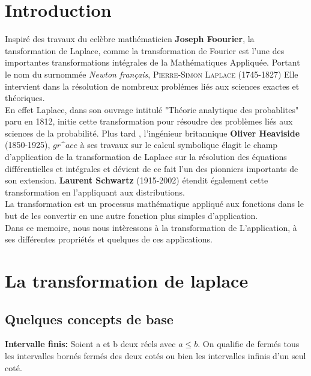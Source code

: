 \documentclass[12pt,a4paper]{report}
\begin{document}
\pagecolor{white!10}
\tableofcontents

\newpage

\chapter{Introduction}

   Inspiré des travaux du celèbre mathématicien \textbf{Joseph Foourier}, la tansformation de Laplace, comme la transformation de Fourier est l'une des importantes transformations intégrales de la Mathématiques Appliquée. 
Portant le nom du surnommée \textit{Newton français}, \textsc{Pierre-Simon Laplace} (1745-1827) Elle intervient dans la résolution de nombreux problémes liés aux sciences exactes et théoriques.\\
En effet Laplace, dans son ouvrage intitulé "Théorie analytique des probablites" paru en 1812, initie cette transformation pour résoudre des problèmes liés aux sciences de la probabilité. Plus tard , l'ingénieur britannique \textbf{Oliver Heaviside } (1850-1925), $gr\^ace$ à ses travaux sur le calcul symbolique élagit le champ d'application de la transformation de Laplace sur la résolution des équations différentielles et intégrales et dévient de ce fait l'un des pionniers importants de son extension. \textbf{Laurent Schwartz} (1915-2002) étendit également cette transformation en l'appliquant aux distributions.\\
La transformation est un processus mathématique appliqué aux fonctions dans le but de les convertir en une autre fonction plus simples d'application.\\
   Dans ce memoire, nous nous intèressons à la transformation de L'application, à ses différentes propriétés et quelques de ces applications.


\chapter{ La transformation de laplace}

 \section{Quelques concepts de base}

\textbf{Intervalle finis:} Soient a et b deux réels avec $a \leqslant b$.
  On qualifie de  fermés tous les intervalles bornés fermés des deux cotés ou bien les intervalles infinis d'un seul coté.\\
\end{document}
